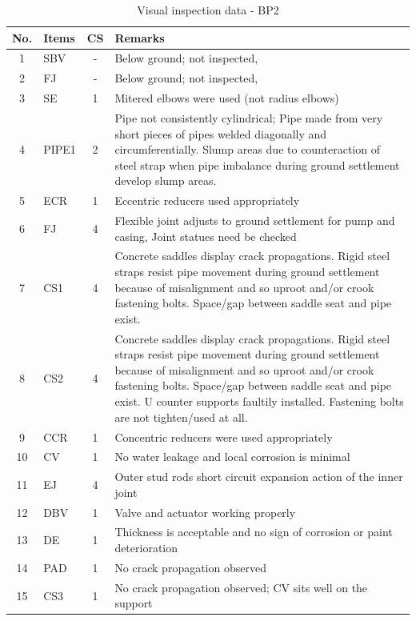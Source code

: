 \begin{table}[!h]
	\caption{Visual inspection data - BP2}
	\label{ch04_visualinspectionbp2}
		{\scriptsize
\begin{tabular}{c|l|c|p{12cm}}
\hline
No. & Items & CS & Remarks \\ 
\hline
1 & SBV & - & Below ground; not inspected,  \\ 
2 & FJ & - & Below ground; not inspected, \\ 
3 & SE & 1 & Mitered elbows were used (not radius elbows) \\ 
4 & PIPE1 & 2 & Pipe not consistently cylindrical; Pipe made from very short pieces of pipes welded diagonally and circumferentially. Slump areas due to counteraction of steel strap when pipe imbalance during ground settlement develop slump areas. \\ 
5 & ECR & 1 & Eccentric reducers used appropriately \\ 
6 & FJ & 4 & Flexible joint adjusts to ground settlement for pump and casing, Joint statues need be checked \\ 
7 & CS1 & 4 & Concrete saddles display crack propagations. Rigid steel straps resist pipe movement during ground settlement because of misalignment and so uproot and/or crook fastening bolts. Space/gap between saddle seat and pipe exist. \\ 
8 & CS2 & 4 & Concrete saddles display crack propagations. Rigid steel straps resist pipe movement during ground settlement because of misalignment and so uproot and/or crook fastening bolts. Space/gap between saddle seat and pipe exist. U counter supports faultily installed. Fastening bolts are not tighten/used at all. \\ 
9 & CCR & 1 & Concentric reducers were used appropriately \\ 
10 & CV & 1 & No water leakage and local corrosion is minimal \\ 
11 & EJ & 4 & Outer stud rods short circuit expansion action of the inner joint \\ 
12 & DBV & 1 & Valve and actuator working properly  \\ 
13 & DE & 1 & Thickness is acceptable and no sign of corrosion or paint deterioration \\ 
14 & PAD & 1 & No crack propagation observed \\ 
15 & CS3 & 1 & No crack propagation observed; CV sits well on the support  \\ 
\hline
\end{tabular}
	}
\end{table}

